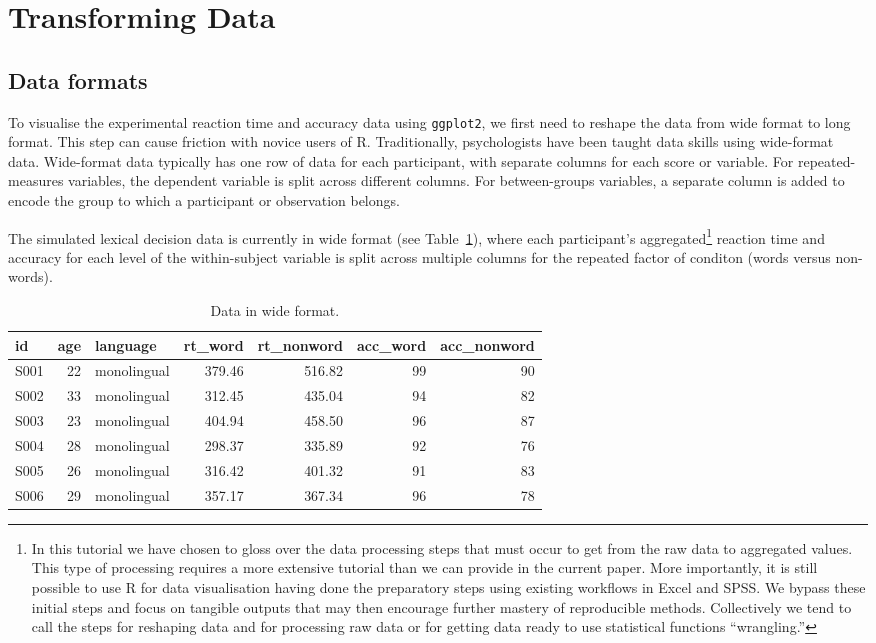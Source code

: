 \documentclass[
  english,
  doc,floatsintext]{apa6}
\begin{document}
\hypertarget{transforming-data}{%
\section{Transforming Data}\label{transforming-data}}

\hypertarget{data-formats}{%
\subsection{Data formats}\label{data-formats}}

To visualise the experimental reaction time and accuracy data using \texttt{ggplot2}, we first need to reshape the data from wide format to long format. This step can cause friction with novice users of R. Traditionally, psychologists have been taught data skills using wide-format data. Wide-format data typically has one row of data for each participant, with separate columns for each score or variable. For repeated-measures variables, the dependent variable is split across different columns. For between-groups variables, a separate column is added to encode the group to which a participant or observation belongs.

The simulated lexical decision data is currently in wide format (see Table~\ref{tab:wide-data}), where each participant's aggregated\footnote{In this tutorial we have chosen to gloss over the data processing steps that must occur to get from the raw data to aggregated values. This type of processing requires a more extensive tutorial than we can provide in the current paper. More importantly, it is still possible to use R for data visualisation having done the preparatory steps using existing workflows in Excel and SPSS. We bypass these initial steps and focus on tangible outputs that may then encourage further mastery of reproducible methods. Collectively we tend to call the steps for reshaping data and for processing raw data or for getting data ready to use statistical functions ``wrangling.''} reaction time and accuracy for each level of the within-subject variable is split across multiple columns for the repeated factor of conditon (words versus non-words).

\begin{table}

\caption{\label{tab:wide-data}Data in wide format.}
\centering
\begin{tabular}[t]{l|r|l|r|r|r|r}
\hline
id & age & language & rt\_word & rt\_nonword & acc\_word & acc\_nonword\\
\hline
S001 & 22 & monolingual & 379.46 & 516.82 & 99 & 90\\
\hline
S002 & 33 & monolingual & 312.45 & 435.04 & 94 & 82\\
\hline
S003 & 23 & monolingual & 404.94 & 458.50 & 96 & 87\\
\hline
S004 & 28 & monolingual & 298.37 & 335.89 & 92 & 76\\
\hline
S005 & 26 & monolingual & 316.42 & 401.32 & 91 & 83\\
\hline
S006 & 29 & monolingual & 357.17 & 367.34 & 96 & 78\\
\hline
\end{tabular}
\end{table}
\end{document}
